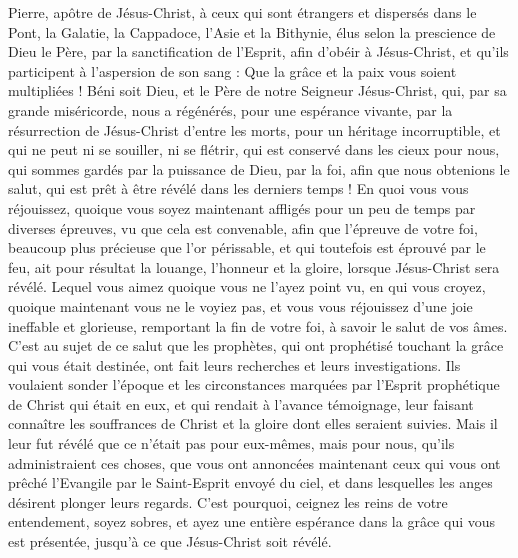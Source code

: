 \begin{multicols}{2}
\VerseOne{}Pierre, apôtre de Jésus-Christ, à ceux qui sont étrangers et dispersés dans le Pont, la Galatie, la Cappadoce, l'Asie et la Bithynie,
élus selon la prescience de Dieu le Père, par la sanctification de l'Esprit, afin d'obéir à Jésus-Christ, et qu'ils participent à l'aspersion de son sang : Que la grâce et la paix vous soient multipliées !
Béni soit Dieu, et le Père de notre Seigneur Jésus-Christ, qui, par sa grande miséricorde, nous a régénérés, pour une espérance vivante, par la résurrection de Jésus-Christ d'entre les morts,
pour un héritage incorruptible, et qui ne peut ni se souiller, ni se flétrir, qui est conservé dans les cieux pour nous,
qui sommes gardés par la puissance de Dieu, par la foi, afin que nous obtenions le salut, qui est prêt à être révélé dans les derniers temps !
En quoi vous vous réjouissez, quoique vous soyez maintenant affligés pour un peu de temps par diverses épreuves, vu que cela est convenable,
afin que l'épreuve de votre foi, beaucoup plus précieuse que l'or périssable, et qui toutefois est éprouvé par le feu, ait pour résultat la louange, l'honneur et la gloire, lorsque Jésus-Christ sera révélé.
Lequel vous aimez quoique vous ne l'ayez point vu, en qui vous croyez, quoique maintenant vous ne le voyiez pas, et vous vous réjouissez d'une joie ineffable et glorieuse,
remportant la fin de votre foi, à savoir le salut de vos âmes.
C'est au sujet de ce salut que les prophètes, qui ont prophétisé touchant la grâce qui vous était destinée, ont fait leurs recherches et leurs investigations.
Ils voulaient sonder l'époque et les circonstances marquées par l'Esprit prophétique de Christ qui était en eux, et qui rendait à l'avance témoignage, leur faisant connaître les souffrances de Christ et la gloire dont elles seraient suivies.
Mais il leur fut révélé que ce n'était pas pour eux-mêmes, mais pour nous, qu'ils administraient ces choses, que vous ont annoncées maintenant ceux qui vous ont prêché l'Evangile par le Saint-Esprit envoyé du ciel, et dans lesquelles les anges désirent plonger leurs regards.
C'est pourquoi, ceignez les reins de votre entendement, soyez sobres, et ayez une entière espérance dans la grâce qui vous est présentée, jusqu'à ce que Jésus-Christ soit révélé.

\end{multicols}

